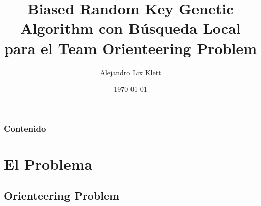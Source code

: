 \documentclass{beamer}
\title[BRKGA - BL - TOP]{Biased Random Key Genetic Algorithm con B\'usqueda Local para el Team Orienteering Problem} %
\author{Alejandro Lix Klett} %
\institute[UBA] %
{
Directora: Prof. Dra. Irene Loiseau\\ 
\medskip
Departamento de Computaci\'on\\ %
}
\date{\today} %
\begin{document}
\begin{frame}
\titlepage %
\end{frame}

\begin{frame}[allowframebreaks]
\frametitle{Contenido} %

\tableofcontents[sections={1-2}]
    \framebreak
  \tableofcontents[sections={3-6}]
\end{frame}



\section{El Problema}
\subsection{Orienteering Problem} %

\end{document}
